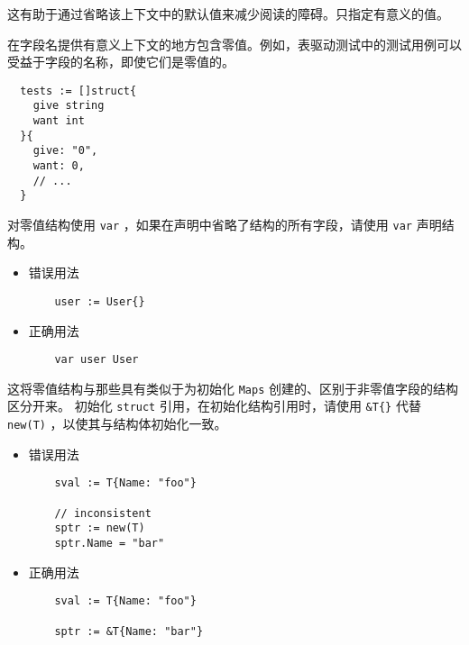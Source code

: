 这有助于通过省略该上下文中的默认值来减少阅读的障碍。只指定有意义的值。

在字段名提供有意义上下文的地方包含零值。例如，表驱动测试中的测试用例可以受益于字段的名称，即使它们是零值的。
\begin{verbatim}
  tests := []struct{
  	give string
  	want int
  }{
  	give: "0",
  	want: 0,
  	// ...
  }
\end{verbatim}

对零值结构使用 \texttt{var} ，如果在声明中省略了结构的所有字段，请使用 \texttt{var} 声明结构。
\begin{itemize}[leftmargin=4em]
\item 错误用法

  \begin{verbatim}
    user := User{}
  \end{verbatim}
\item 正确用法

  \begin{verbatim}
    var user User
  \end{verbatim}
\end{itemize}

这将零值结构与那些具有类似于为{初始化 \texttt{Maps}} 创建的、区别于非零值字段的结构区分开来。
初始化 \texttt{struct} 引用，在初始化结构引用时，请使用 \texttt{\&T\{\}} 代替 \texttt{new(T)} ，以使其与结构体初始化一致。
\begin{itemize}[leftmargin=4em]
\item 错误用法

  \begin{verbatim}
    sval := T{Name: "foo"}

    // inconsistent
    sptr := new(T)
    sptr.Name = "bar"
  \end{verbatim}
\item 正确用法

  \begin{verbatim}
    sval := T{Name: "foo"}

    sptr := &T{Name: "bar"}
  \end{verbatim}
\end{itemize}
